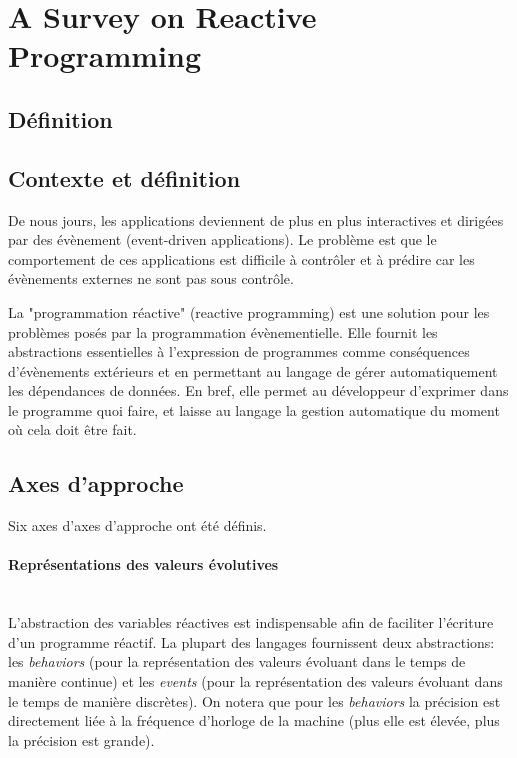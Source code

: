 \documentclass[11pt,twocolumn]{article}
\begin{document}
\section*{A Survey on Reactive Programming}

\subsection*{Définition}

\subsection*{Contexte et définition}
De nous jours, les applications deviennent de plus en plus interactives et dirigées par des évènement (event-driven applications). Le problème est que le comportement de ces applications est difficile à contrôler et à prédire car les évènements externes ne sont pas sous contrôle.

La "programmation réactive" (reactive programming) est une solution pour les problèmes posés par la programmation évènementielle. Elle fournit les abstractions essentielles à l'expression de programmes comme conséquences d'évènements extérieurs et en permettant au langage de gérer automatiquement les dépendances de données. En bref, elle permet au développeur d'exprimer dans le programme quoi faire, et laisse au langage la gestion automatique du moment où cela doit être fait.

\subsection*{Axes d'approche}
Six axes d'axes d'approche ont été définis.

\paragraph{Représentations des valeurs évolutives}
~~\\
L'abstraction des variables réactives est indispensable afin de faciliter l'écriture d'un programme réactif. La plupart des langages fournissent deux abstractions: les \textit{behaviors} (pour la représentation des valeurs évoluant dans le temps de manière continue) et les \textit{events} (pour la représentation des valeurs évoluant dans le temps de manière discrètes). On notera que pour les \textit{behaviors} la précision est directement liée à la fréquence d'horloge de la machine (plus elle est élevée, plus la précision est grande).
\end{document}
